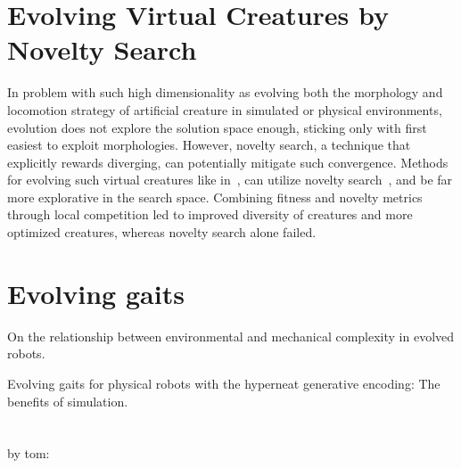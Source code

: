 \section{Evolving Virtual Creatures by Novelty Search}

In problem with such high dimensionality as evolving both the morphology and locomotion strategy of artificial creature in simulated or physical environments, evolution does not explore the solution space enough, sticking only with first easiest to exploit morphologies. However, novelty search, a technique that explicitly rewards diverging, can potentially mitigate such convergence. Methods for evolving such virtual creatures like in~\cite{sims1994evolving}, can utilize novelty search~\cite{lehman2011evolving}, and be far more explorative in the search space. Combining fitness and novelty metrics through local competition led to improved diversity of creatures and more optimized creatures, whereas novelty search alone failed.






\section{Evolving gaits}


\cite{auerbach2012relationship} On  the  relationship  between  environmental and mechanical complexity in evolved robots.

\cite{lee2013evolving} Evolving gaits  for  physical  robots  with  the  hyperneat  generative  encoding:   The  benefits  of simulation.


\section*{}

\cite{clune2011performance}
\cite{clune2013evolutionary}
\cite{lipson2000automatic}
\cite{hiller2010evolving}
\cite{rieffel2014growing}
by tom: \cite{Paoletti07092014}


